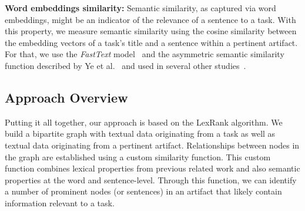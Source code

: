 \vspace{3mm}
\begin{hangparas}{1em}{1}
    \textbf{Word embeddings similarity:} Semantic similarity, as captured via word embeddings, might be an indicator of the relevance of a sentence to a task. With this property, we measure semantic similarity using the cosine similarity between the embedding vectors of a task's title and a sentence within a pertinent artifact. 
    For that, we use the \textit{FastText} model~\cite{bojanowski2017FastText} and the asymmetric semantic similarity function described by Ye et al.~\cite{Ye2016} and used in several other studies~\cite{silva2019, Huang2018, Xu2017}.
\end{hangparas}




\clearpage

\subsection{Approach Overview}


Putting it all together, our approach is based on the LexRank algorithm.
We build a bipartite graph with textual data originating from a task as well as textual data originating from a pertinent artifact.
Relationships between nodes in the graph are established using a custom similarity function.
This custom function combines lexical properties from previous related work 
and also semantic properties at the word and sentence-level.
Through this function, we can identify a number of prominent nodes (or sentences)
in an artifact that likely contain information relevant to a task.










